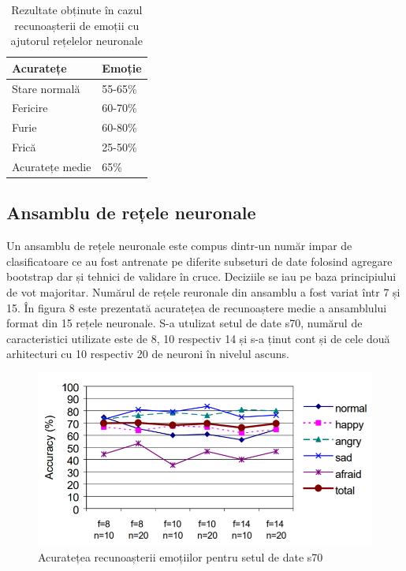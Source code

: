 \documentclass[9pt,shortpaper,twoside,web]{ieeecolor}
\begin{document}
\begin{table}[htb]
\centering
\caption{Rezultate obținute în cazul recunoașterii de emoții cu ajutorul rețelelor neuronale}
\label{table1}
\setlength{\tabcolsep}{3pt}
\begin{tabular}{|p{}|p{}|}
\hline


Acuratețe&
Emoție\\
\hline

Stare normală&
55-65\%\\
\hline

Fericire&
60-70\%\\
\hline

Furie&
60-80\%\\
\hline

Frică&
25-50\%\\
\hline

Acuratețe medie&
65\%\\
\hline

\end{tabular}
\label{tab1}
\end{table}


\subsection{Ansamblu de rețele neuronale}
Un ansamblu de rețele neuronale este compus dintr-un număr impar de clasificatoare ce au fost antrenate pe diferite subseturi de date folosind agregare bootstrap dar și tehnici de validare în cruce. Deciziile se iau pe baza principiului de vot majoritar. Numărul de rețele reuronale din ansamblu a fost variat într 7 și 15. În figura 8 este prezentată acuratețea de recunoaștere medie a ansamblului format din 15 rețele neuronale. S-a utulizat setul de date s70, numărul de caracteristici utilizate este de 8, 10 respectiv 14 și s-a ținut cont și de cele două arhitecturi cu 10 respectiv 20 de neuroni în nivelul ascuns.

\begin{figure}[htb]
\includegraphics[width=\columnwidth]{res/fig/precizia-medie-a-recunoasterii-emotiilor}
\caption{Acuratețea recunoașterii emoțiilor pentru setul de date s70 \cite{b9}}
\label{fig8}
\end{figure}
\end{document}
